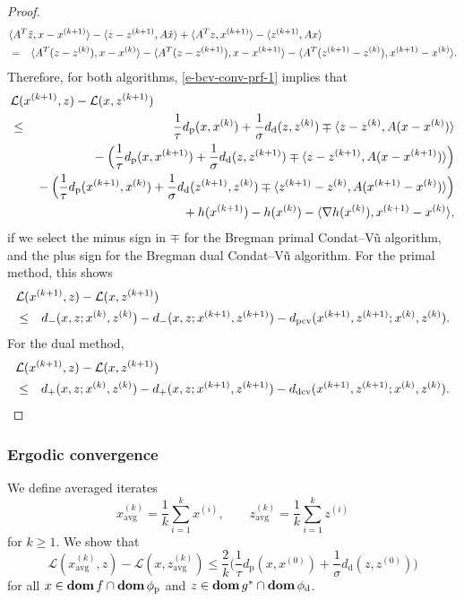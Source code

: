 \documentclass[letterpaper,11pt]{article}
\newcommand{\BEAS}{\begin{eqnarray*}}
\newcommand{\EEAS}{\end{eqnarray*}}
\newcommand{\dom}{\mathop{\bf dom}}
\newcommand{\inprod}[2]{\langle#1, #2\rangle}
\newcommand{\avg}{\mathrm{avg}}
\newcommand{\primal}{\mathrm p}
\newcommand{\dual}{\mathrm d}
\newcommand{\cL}{\mathcal L}
\begin{document}
\begin{proof}
\BEAS
\lefteqn{\inprod{A^T\tilde z}{x-x^{(k+1)}}
  -\inprod{z-z^{(k+1)}}{A\tilde x}
  +\inprod{A^T z}{x^{(k+1)}} - \inprod{z^{(k+1)}}{Ax}} \\
&=& \inprod {A^T(z-z^{(k)})} {x-x^{(k)}}
  -\inprod {A^T(z-z^{(k+1)})} {x-x^{(k+1)}}
  -\inprod {A^T(z^{(k+1)}-z^{(k)})} {x^{(k+1)}-x^{(k)}}.
\EEAS
Therefore, for both algorithms, \eqref{e-bcv-conv-prf-1}  implies that
\BEAS
\lefteqn{\cL(x^{(k+1)}, z) - \cL(x,z^{(k+1)})} \nonumber \\
&\leq& \frac{1}{\tau} d_\primal(x,x^{(k)})
  + \frac{1}{\sigma} d_\dual(z,z^{(k)})
  \mp \inprod{z-z^{(k)}}{A(x-x^{(k)})} \nonumber \\
& &\mbox{} - \Big(\frac{1}{\tau} d_\primal(x,x^{(k+1)})
  + \frac{1}{\sigma} d_\dual(z,z^{(k+1)})
  \mp \inprod{z-z^{(k+1)}}{A(x-x^{(k+1)})} \Big) \nonumber \\
& &\mbox{} -\Big(\frac{1}{\tau} d_\primal(x^{(k+1)},x^{(k)})
  + \frac{1}{\sigma} d_\dual(z^{(k+1)},z^{(k)})
  \mp \inprod{z^{(k+1)} - z^{(k)}}{A(x^{(k+1)}-x^{(k)})} \Big) 
\nonumber \\
& & \mbox{} +
  h(x^{(k+1)})-h(x^{(k)}) -\inprod{\nabla h(x^{(k)})}{x^{(k+1)}-x^{(k)}},
\EEAS
if we select the minus sign in $\mp$ for the Bregman primal Condat--V\~u
algorithm, and the plus sign for the Bregman dual Condat--V\~u algorithm.
For the primal method, this shows
\BEAS
\lefteqn{\cL(x^{(k+1)}, z) - \cL(x,z^{(k+1)})} \\
 &\leq & d_-(x,z;x^{(k)},z^{(k)})- d_-(x,z;x^{(k+1)},z^{(k+1)}) 
 - d_\mathrm{pcv}(x^{(k+1)},z^{(k+1)};x^{(k)},z^{(k)}).
\EEAS
For the dual method,
\BEAS
\lefteqn{\cL(x^{(k+1)}, z) - \cL(x,z^{(k+1)})} \\
&\leq & d_+(x,z;x^{(k)},z^{(k)})- d_+(x,z;x^{(k+1)},z^{(k+1)}) 
  - d_\mathrm{dcv}(x^{(k+1)},z^{(k+1)};x^{(k)},z^{(k)}). 
\EEAS
\end{proof}

\subsubsection{Ergodic convergence}

We define averaged iterates 
\begin{equation} \label{e-bcv-avg}
x^{(k)}_\avg = \frac{1}{k} \sum_{i=1}^k x^{(i)}, \qquad 
z^{(k)}_\avg = \frac{1}{k} \sum_{i=1}^k z^{(i)} 
\end{equation} 
for $k \geq 1$.
We show that 
\begin{equation} \label{e-bcv-conv}
\cL(x^{(k)}_\avg, z) - \cL(x, z^{(k)}_\avg)
\leq \frac{2}{k} \Big(\frac{1}{\tau} d_\primal (x,x^{(0)})
  + \frac{1}{\sigma} d_\dual (z,z^{(0)}) \Big)
\end{equation}
for all 
$x \in \dom f \cap \dom \phi_\primal$ and
$z \in \dom g^\ast \cap \dom \phi_\dual$.
\end{document}
